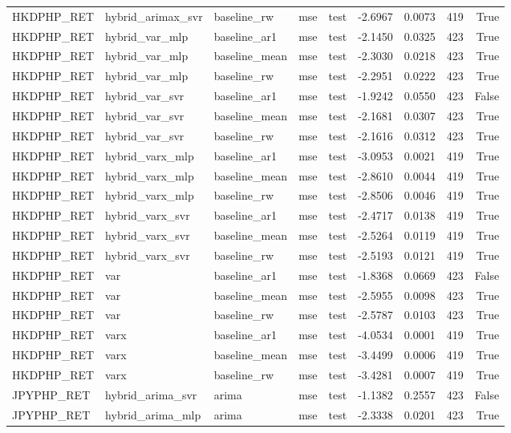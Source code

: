 \begin{tabular}{lllllrrrr}
HKDPHP_RET & hybrid_arimax_svr & baseline_rw & mse & test & -2.6967 & 0.0073 & 419 & True \\
HKDPHP_RET & hybrid_var_mlp & baseline_ar1 & mse & test & -2.1450 & 0.0325 & 423 & True \\
HKDPHP_RET & hybrid_var_mlp & baseline_mean & mse & test & -2.3030 & 0.0218 & 423 & True \\
HKDPHP_RET & hybrid_var_mlp & baseline_rw & mse & test & -2.2951 & 0.0222 & 423 & True \\
HKDPHP_RET & hybrid_var_svr & baseline_ar1 & mse & test & -1.9242 & 0.0550 & 423 & False \\
HKDPHP_RET & hybrid_var_svr & baseline_mean & mse & test & -2.1681 & 0.0307 & 423 & True \\
HKDPHP_RET & hybrid_var_svr & baseline_rw & mse & test & -2.1616 & 0.0312 & 423 & True \\
HKDPHP_RET & hybrid_varx_mlp & baseline_ar1 & mse & test & -3.0953 & 0.0021 & 419 & True \\
HKDPHP_RET & hybrid_varx_mlp & baseline_mean & mse & test & -2.8610 & 0.0044 & 419 & True \\
HKDPHP_RET & hybrid_varx_mlp & baseline_rw & mse & test & -2.8506 & 0.0046 & 419 & True \\
HKDPHP_RET & hybrid_varx_svr & baseline_ar1 & mse & test & -2.4717 & 0.0138 & 419 & True \\
HKDPHP_RET & hybrid_varx_svr & baseline_mean & mse & test & -2.5264 & 0.0119 & 419 & True \\
HKDPHP_RET & hybrid_varx_svr & baseline_rw & mse & test & -2.5193 & 0.0121 & 419 & True \\
HKDPHP_RET & var & baseline_ar1 & mse & test & -1.8368 & 0.0669 & 423 & False \\
HKDPHP_RET & var & baseline_mean & mse & test & -2.5955 & 0.0098 & 423 & True \\
HKDPHP_RET & var & baseline_rw & mse & test & -2.5787 & 0.0103 & 423 & True \\
HKDPHP_RET & varx & baseline_ar1 & mse & test & -4.0534 & 0.0001 & 419 & True \\
HKDPHP_RET & varx & baseline_mean & mse & test & -3.4499 & 0.0006 & 419 & True \\
HKDPHP_RET & varx & baseline_rw & mse & test & -3.4281 & 0.0007 & 419 & True \\
JPYPHP_RET & hybrid_arima_svr & arima & mse & test & -1.1382 & 0.2557 & 423 & False \\
JPYPHP_RET & hybrid_arima_mlp & arima & mse & test & -2.3338 & 0.0201 & 423 & True \\

\end{tabular}
